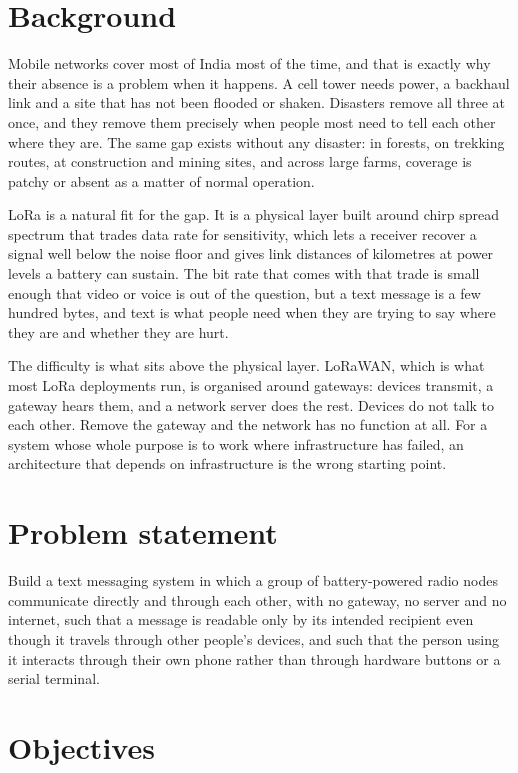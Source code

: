 \documentclass[12pt,a4paper,oneside]{report}
\begin{document}
\section{Background}

Mobile networks cover most of India most of the time, and that is exactly why
their absence is a problem when it happens. A cell tower needs power, a backhaul
link and a site that has not been flooded or shaken. Disasters remove all three
at once, and they remove them precisely when people most need to tell each other
where they are. The same gap exists without any disaster: in forests, on trekking
routes, at construction and mining sites, and across large farms, coverage is
patchy or absent as a matter of normal operation.

LoRa is a natural fit for the gap. It is a physical layer built around chirp
spread spectrum that trades data rate for sensitivity, which lets a receiver
recover a signal well below the noise floor and gives link distances of
kilometres at power levels a battery can sustain. The bit rate that comes with
that trade is small enough that video or voice is out of the question, but a text
message is a few hundred bytes, and text is what people need when they are trying
to say where they are and whether they are hurt.

The difficulty is what sits above the physical layer. LoRaWAN, which is what
most LoRa deployments run, is organised around gateways: devices transmit, a
gateway hears them, and a network server does the rest. Devices do not talk to
each other. Remove the gateway and the network has no function at all. For a
system whose whole purpose is to work where infrastructure has failed, an
architecture that depends on infrastructure is the wrong starting point.

\section{Problem statement}

Build a text messaging system in which a group of battery-powered radio nodes
communicate directly and through each other, with no gateway, no server and no
internet, such that a message is readable only by its intended recipient even
though it travels through other people's devices, and such that the person using
it interacts through their own phone rather than through hardware buttons or a
serial terminal.

\section{Objectives}
\end{document}
